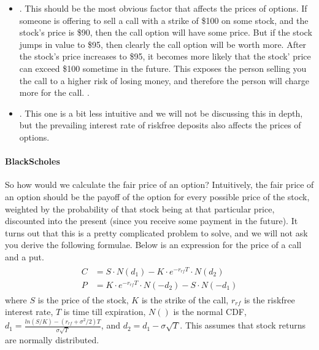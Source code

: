 \documentclass[letterpaper,10pt,english]{jupyterBook}
\begin{document}
\begin{itemize}
\item {} 
\sphinxAtStartPar
{}. This should be the most obvious factor that affects the prices of options. If someone is offering to sell a call with a strike of \$100 on some stock, and the stock’s price is \$90, then the call option will have some price. But if the stock jumps in value to \$95, then clearly the call option will be worth more. After the stock’s price increases to \$95, it becomes more likely that the stock’ price can exceed \$100 sometime in the future. This exposes the person selling you the call to a higher risk of losing money, and therefore the person will charge more for the call. .

\item {} 
\sphinxAtStartPar
{}. This one is a bit less intuitive and we will not be discussing this in depth, but the prevailing interest rate of risk\sphinxhyphen{}free deposits also affects the prices of options.

\end{itemize}


\paragraph{Black\sphinxhyphen{}Scholes}
\label{\detokenize{content/10-finance/options:black-scholes}}
\sphinxAtStartPar
So how would we calculate the fair price of an option? Intuitively, the fair price of an option should be the payoff of the option for every possible price of the stock, weighted by the probability of that stock being at that particular price, discounted into the present (since you receive some payment in the future). It turns out that this is a pretty complicated problem to solve, and we will not ask you derive the following formulae. Below is an expression for the price of a call and a put.
\begin{equation*}
\begin{split}\begin{aligned}
C &= S \cdot N(d_1) - K \cdot e^{-r_{rf}T} \cdot N(d_2) \\
P &= K \cdot e^{-r_{rf}T} \cdot N(-d_2) - S \cdot N(-d_1)
\end{aligned}\end{split}
\end{equation*}
\sphinxAtStartPar
where \(S\) is the price of the stock, \(K\) is the strike of the call, \(r_{rf}\) is the risk\sphinxhyphen{}free interest rate, \(T\) is time till expiration, \(N()\) is the normal CDF, \(d_1 = \frac{ln(S/K) - (r_{rf} + \sigma^2/2)T}{\sigma\sqrt{T}}\), and \(d_2 = d_1 - \sigma\sqrt{T}\). This assumes that stock returns are normally distributed.
\end{document}
